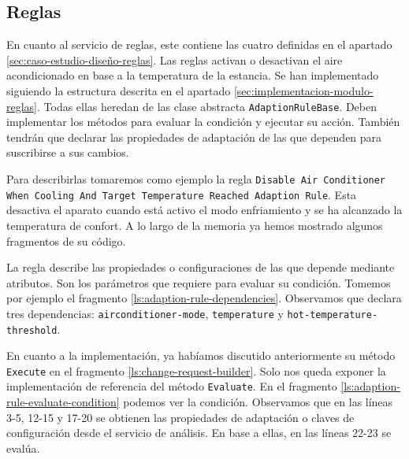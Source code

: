 \subsection{Reglas}

En cuanto al servicio de reglas, este contiene las cuatro definidas en el apartado \ref{sec:caso-estudio-diseño-reglas}. Las reglas activan o desactivan el aire acondicionado en base a la temperatura de la estancia. Se han implementado siguiendo la estructura descrita en el apartado \ref{sec:implementacion-modulo-reglas}. Todas ellas heredan de las clase abstracta \texttt{AdaptionRuleBase}. Deben implementar los métodos para evaluar la condición y ejecutar su acción. También tendrán que declarar las propiedades de adaptación de las que dependen para suscribirse a sus cambios.

Para describirlas tomaremos como ejemplo la regla \texttt{Disable Air Conditioner When Cooling And Target Temperature Reached Adaption Rule}. Esta desactiva el aparato cuando está activo el modo enfriamiento y se ha alcanzado la temperatura de confort. A lo largo de la memoria ya hemos mostrado algunos fragmentos de su código.

La regla describe las propiedades o configuraciones de las que depende mediante atributos. Son los parámetros que requiere para evaluar su condición. Tomemos por ejemplo el fragmento \ref{ls:adaption-rule-dependencies}. Observamos que declara tres dependencias: \texttt{airconditioner-mode}, \texttt{temperature} y \texttt{hot-temperature-threshold}.

En cuanto a la implementación, ya habíamos discutido anteriormente su método \texttt{Execute} en el fragmento \ref{ls:change-request-builder}. Solo nos queda exponer la implementación de referencia del método \texttt{Evaluate}. En el fragmento \ref{ls:adaption-rule-evaluate-condition} podemos ver la condición. Observamos que en las líneas 3-5, 12-15 y 17-20 se obtienen las propiedades de adaptación o claves de configuración desde el servicio de análisis. En base a ellas, en las líneas 22-23 se evalúa.

\pagebreak

